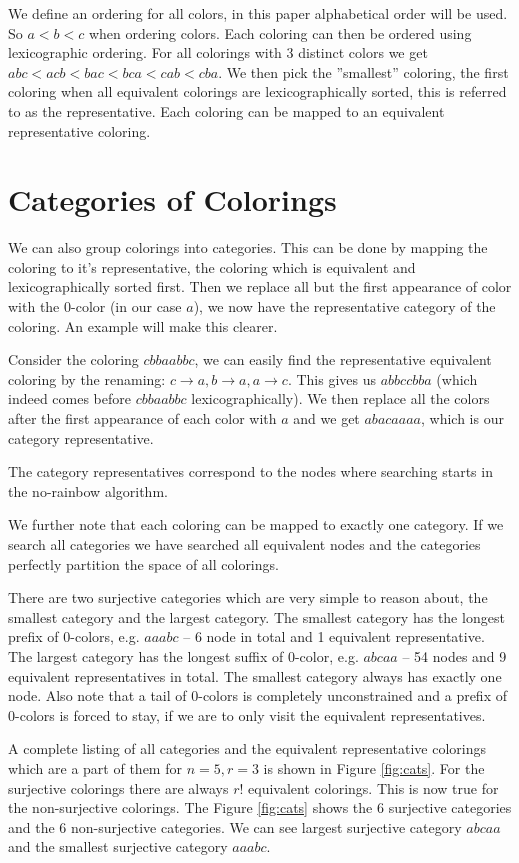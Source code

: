 \documentclass{book}
\begin{document}
We define an ordering for all colors, in this paper alphabetical order will be used. So $a < b < c$ when ordering colors. Each coloring can then be ordered using lexicographic ordering. For all colorings with 3 distinct colors we get $abc < acb < bac < bca < cab < cba$. We then pick the ''smallest'' coloring, the first coloring when all equivalent colorings are lexicographically sorted, this is referred to as the representative. Each coloring can be mapped to an equivalent representative coloring.

\section{Categories of Colorings}
We can also group colorings into categories. This can be done by mapping the coloring to it's representative, the coloring which is equivalent and lexicographically sorted first. Then we replace all but the first appearance of color with the 0-color (in our case $a$), we now have the representative category of the coloring. An example will make this clearer.

Consider the coloring $cbbaabbc$, we can easily find the representative equivalent coloring by the renaming: $c \rightarrow a, b \rightarrow a, a \rightarrow c$. This gives us $abbccbba$ (which indeed comes before $cbbaabbc$ lexicographically). We then replace all the colors after the first appearance of each color with $a$ and we get $abacaaaa$, which is our category representative.

The category representatives correspond to the nodes where searching starts in the no-rainbow algorithm.

We further note that each coloring can be mapped to exactly one category. If we search all categories we have searched all equivalent nodes and the categories perfectly partition the space of all colorings.

There are two surjective categories which are very simple to reason about, the smallest category and the largest category. The smallest category has the longest prefix of 0-colors, e.g. $aaabc$ -- 6 node in total and 1 equivalent representative. The largest category has the longest suffix of 0-color, e.g. $abcaa$ -- 54 nodes and 9 equivalent representatives in total. The smallest category always has exactly one node. Also note that a tail of 0-colors is completely unconstrained and a prefix of 0-colors is forced to stay, if we are to only visit the equivalent representatives.

A complete listing of all categories and the equivalent representative colorings which are a part of them for $n=5, r=3$ is shown in Figure \ref{fig:cats}. For the surjective colorings there are always $r!$ equivalent colorings. This is now true for the non-surjective colorings. The Figure \ref{fig:cats} shows the 6 surjective categories and the 6 non-surjective categories. We can see largest surjective category $abcaa$ and the smallest surjective category $aaabc$.
\end{document}
